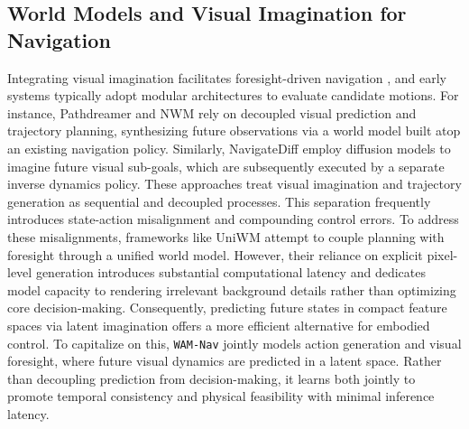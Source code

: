 \documentclass{article}
\begin{document}
\subsection{World Models and Visual Imagination for Navigation}

Integrating visual imagination facilitates foresight-driven navigation \citep{zhang2026sparsevideonav, nie2025wmnav}, and early systems typically adopt modular architectures to evaluate candidate motions. For instance, Pathdreamer \citep{koh2021pathdreamer} and NWM \citep{bar2025nwm} rely on decoupled visual prediction and trajectory planning, synthesizing future observations via a world model built atop an existing navigation policy. Similarly, NavigateDiff \citep{qin2025navigatediff} employ diffusion models \citep{ho2020denoising} to imagine future visual sub-goals, which are subsequently executed by a separate inverse dynamics policy. These approaches treat visual imagination and trajectory generation as sequential and decoupled processes. This separation frequently introduces state-action misalignment and compounding control errors. To address these misalignments, frameworks like UniWM \citep{dong2025uniwm} attempt to couple planning with foresight through a unified world model. However, their reliance on explicit pixel-level generation introduces substantial computational latency and dedicates model capacity to rendering irrelevant background details rather than optimizing core decision-making. Consequently, predicting future states in compact feature spaces via latent imagination \citep{hafner2020dreamer, clam2025, navmorph2025, beingh072025} offers a more efficient alternative for embodied control. To capitalize on this, \texttt{WAM-Nav} jointly models action generation and visual foresight, where future visual dynamics are predicted in a latent space. Rather than decoupling prediction from decision-making, it learns both jointly to promote temporal consistency and physical feasibility with minimal inference latency.


\end{document}
